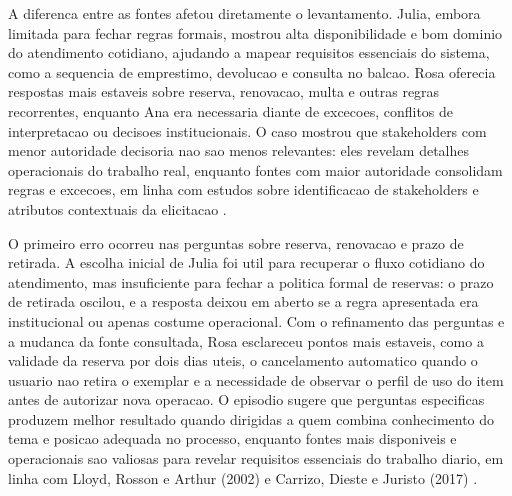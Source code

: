 \documentclass[12pt]{article}
\begin{document}
%
A diferenca entre as fontes afetou diretamente o levantamento. Julia, embora limitada para fechar regras formais, mostrou alta disponibilidade e bom dominio do atendimento cotidiano, ajudando a mapear requisitos essenciais do sistema, como a sequencia de emprestimo, devolucao e consulta no balcao. Rosa oferecia respostas mais estaveis sobre reserva, renovacao, multa e outras regras recorrentes, enquanto Ana era necessaria diante de excecoes, conflitos de interpretacao ou decisoes institucionais. O caso mostrou que stakeholders com menor autoridade decisoria nao sao menos relevantes: eles revelam detalhes operacionais do trabalho real, enquanto fontes com maior autoridade consolidam regras e excecoes, em linha com estudos sobre identificacao de stakeholders e atributos contextuais da elicitacao \cite{sharp1999stakeholder,carrizo2017context}.

%
%
O primeiro erro ocorreu nas perguntas sobre reserva, renovacao e prazo de retirada. A escolha inicial de Julia foi util para recuperar o fluxo cotidiano do atendimento, mas insuficiente para fechar a politica formal de reservas: o prazo de retirada oscilou, e a resposta deixou em aberto se a regra apresentada era institucional ou apenas costume operacional. Com o refinamento das perguntas e a mudanca da fonte consultada, Rosa esclareceu pontos mais estaveis, como a validade da reserva por dois dias uteis, o cancelamento automatico quando o usuario nao retira o exemplar e a necessidade de observar o perfil de uso do item antes de autorizar nova operacao. O episodio sugere que perguntas especificas produzem melhor resultado quando dirigidas a quem combina conhecimento do tema e posicao adequada no processo, enquanto fontes mais disponiveis e operacionais sao valiosas para revelar requisitos essenciais do trabalho diario, em linha com Lloyd, Rosson e Arthur (2002) e Carrizo, Dieste e Juristo (2017) \cite{lloyd2002distributed,carrizo2017context}.
\end{document}
